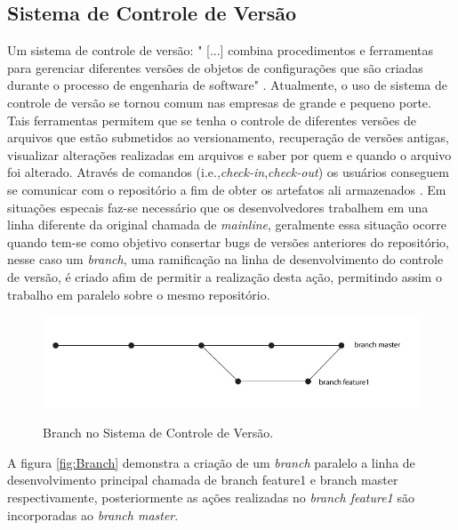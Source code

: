 \subsection{Sistema de Controle de Versão}
Um sistema de controle de versão: "	[...] combina procedimentos e ferramentas para gerenciar diferentes versões de objetos de configurações que são criadas durante o processo de engenharia de software" \cite[p.~927]{pressman2010}.
Atualmente, o uso de sistema de controle de versão se tornou comum nas empresas de grande e pequeno porte. Tais ferramentas permitem que se tenha o controle de diferentes versões de arquivos que estão submetidos ao versionamento, recuperação de versões antigas, visualizar alterações realizadas em arquivos e saber por quem e quando o arquivo foi alterado. Através de comandos (i.e.,\textit{check-in},\textit{check-out}) os usuários conseguem se comunicar com o repositório a fim de obter os artefatos ali armazenados \cite{gleiph2011}. Em situações especais faz-se necessário que os desenvolvedores trabalhem em una linha diferente da original chamada de \textit{mainline}, geralmente essa situação ocorre quando tem-se como objetivo consertar bugs de versões anteriores do repositório, nesse caso um \textit{branch}, uma ramificação na linha de desenvolvimento do controle de versão, é criado afim de permitir a realização desta ação, permitindo assim o trabalho em paralelo sobre o mesmo repositório.
\begin{figure}[h]
\centering
\caption[Branch no Sistema de Controle de Versão]{Branch no Sistema de Controle de Versão.}
\includegraphics[width=0.5\linewidth]{./images/branch}
\label{fig:Branch}
\end{figure}
A figura \autoref{fig:Branch} demonstra a criação de um \textit{branch} paralelo a linha de desenvolvimento principal chamada de branch feature1 e branch master respectivamente, posteriormente as ações realizadas no \textit{branch feature1} são incorporadas ao \textit{branch master}.
